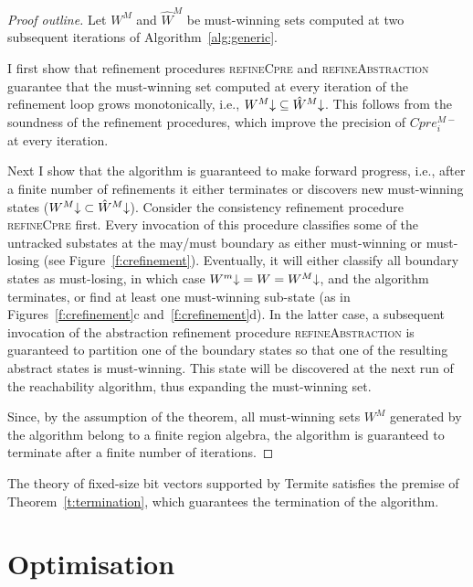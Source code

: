 \begin{proof}[Proof outline]

Let $W^M$ and $\hat{W}^M$ be must-winning sets computed at two subsequent iterations of Algorithm~\ref{alg:generic}.  

I first show that refinement procedures \textsc{refineCpre} and \textsc{refineAbstraction} guarantee that the must-winning set computed at every iteration of the refinement loop grows monotonically, i.e., $W^M\mathord{\downarrow} \subseteq \hat{W}^M\mathord{\downarrow}$.  This follows from the soundness of the refinement procedures, which improve the precision of $Cpre_i^{M-}$ at every iteration. 

Next I show that the algorithm is guaranteed to make forward progress, i.e., after a finite number of refinements it either terminates or discovers new must-winning states ($W^M\mathord{\downarrow} \subset \hat{W}^M\mathord{\downarrow}$).  Consider the consistency refinement procedure \textsc{refineCpre} first.  Every invocation of this procedure classifies some of the untracked substates at the may/must boundary as either must-winning or must-losing (see Figure~\ref{f:crefinement}).  Eventually, it will either classify all boundary states as must-losing, in which case $W^m\mathord{\downarrow} = W = W^M\mathord{\downarrow}$, and the algorithm terminates, or find at least one must-winning sub-state (as in Figures~\ref{f:crefinement}c and~\ref{f:crefinement}d).  In the latter case, a subsequent invocation of the abstraction refinement procedure \textsc{refineAbstraction} is guaranteed to partition one of the boundary states so that one of the resulting abstract states is must-winning.  This state will be discovered at the next run of the reachability algorithm, thus expanding the must-winning set.

Since, by the assumption of the theorem, all must-winning sets $W^M$ generated by the algorithm belong to a finite region algebra, the algorithm is guaranteed to terminate after a finite number of iterations.

\end{proof}

The theory of fixed-size bit vectors supported by Termite satisfies the premise of Theorem~\ref{t:termination}, which guarantees the termination of the algorithm.

\section{Optimisation}
\label{sec:optimisation}

